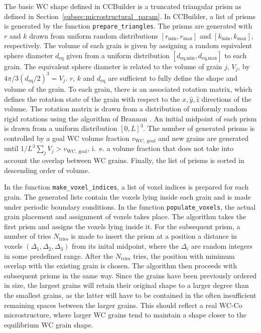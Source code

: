 \documentclass[10pt,a4paper]{article}
\begin{document}
The basic WC shape defined in CCBuilder is a truncated triangular prism as defined in Section~\ref{subsec:microstructural_param}. In CCBuilder, a list of prisms is generated by the function \verb|prepare_triangles|. The prisms are generated with $r$ and $k$ drawn from uniform random distributions $[r_\text{min},r_\text{max}]$ and $[k_\text{min},k_\text{max}]$, respectively. The volume of each grain is given by assigning a random equivalent sphere diameter $d_\text{eq}$ given from a uniform distribution $[d_\text{eq,min},d_\text{eq,max}]$ to each grain. The equivalent sphere diameter is related to the volume of grain $j$, $V_j$, by $4\pi/3 (d_\text{eq}/2)^3 = V_j$. $r$, $k$ and $d_\text{eq}$ are sufficient to fully define the shape and volume of the grain. To each grain, there is an associated rotation matrix, which defines the rotation state of the grain with respect to the $\hat{x}, \hat{y}, \hat{z}$ directions of the volume. The rotation matrix is drawn from a distribution of uniformly random rigid rotations using the algorithm of Brannon \cite{Br02}. An initial midpoint of each prism is drawn from a uniform distribution $[0,L]^3$. The number of generated prisms is controlled by a goal WC volume fraction $v_\text{WC, goal}$ and new grains are generated until $1/L^3 \sum_j V_j > v_\text{WC, goal}$, i.~e. a volume fraction that does not take into account the overlap between WC grains. Finally, the list of prisms is sorted in descending order of volume.

In the function \verb|make_voxel_indices|, a list of voxel indices is prepared for each grain. The generated lists contain the voxels lying inside each grain and is made under periodic boundary conditions. In the function \verb|populate_voxels|, the actual grain placement and assignment of voxels takes place. The algorithm takes the first prism and assigns the voxels lying inside it. For the subsequent prism, a number of tries $N_\text{tries}$ is made to insert the prism at a position a distance in voxels $(\Delta_1, \Delta_2, \Delta_3)$ from its inital midpoint, where the $\Delta_i$ are random integers in some predefined range. After the $N_\text{tries}$ tries, the position with minimum overlap with the existing grain is chosen. The algorithm then proceeds with subsequent prisms in the same way. Since the grains have been previously ordered in size, the largest grains will retain their original shape to a larger degree than the smallest grains, as the latter will have to be contained in the often insufficient remaining spaces between the larger grains. This should reflect a real WC-Co microstructure, where larger WC grains tend to maintain a shape closer to the equilibrium WC grain shape.
\end{document}
